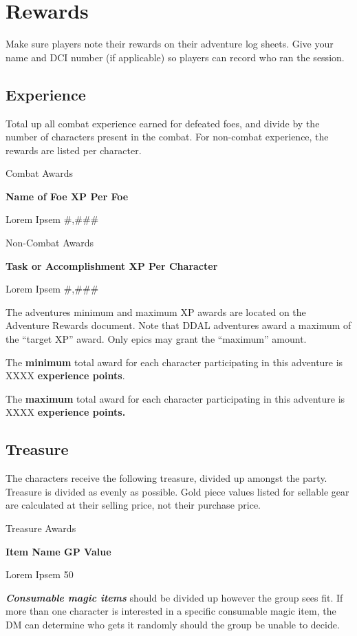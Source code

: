 \section{Rewards}\label{rewards}

Make sure players note their rewards on their adventure log sheets. Give
your name and DCI number (if applicable) so players can record who ran
the session.

\subsection{Experience}\label{experience}

Total up all combat experience earned for defeated foes, and divide by
the number of characters present in the combat. For non-combat
experience, the rewards are listed per character.

Combat Awards

\textbf{Name of Foe XP Per Foe}

Lorem Ipsem \#,\#\#\#

Non-Combat Awards

\textbf{Task or Accomplishment XP Per Character}

Lorem Ipsem \#,\#\#\#

The adventures minimum and maximum XP awards are located on the
Adventure Rewards document. Note that DDAL adventures award a maximum of
the ``target XP'' award. Only epics may grant the ``maximum'' amount.

The \textbf{minimum} total award for each character participating in
this adventure is XXXX \textbf{experience points}.

The \textbf{maximum} total award for each character participating in
this adventure is XXXX \textbf{experience points.}

\subsection{Treasure}\label{treasure-1}

The characters receive the following treasure, divided up amongst the
party. Treasure is divided as evenly as possible. Gold piece values
listed for sellable gear are calculated at their selling price, not
their purchase price.

Treasure Awards

\textbf{Item Name GP Value}

Lorem Ipsem 50

\emph{\textbf{Consumable magic items}} should be divided up however the
group sees fit. If more than one character is interested in a specific
consumable magic item, the DM can determine who gets it randomly should
the group be unable to decide.


